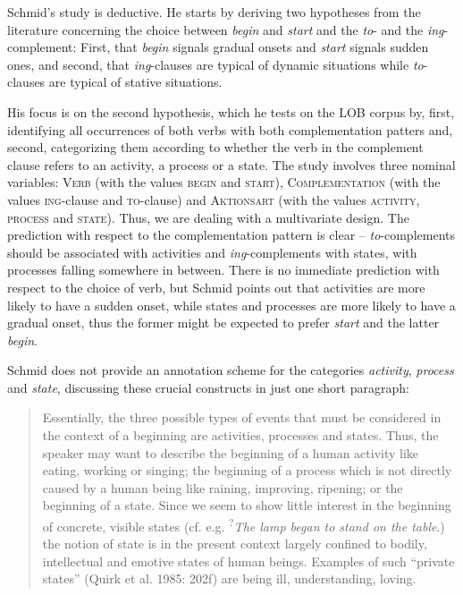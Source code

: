 Schmid's study is deductive. He starts by deriving two hypotheses from the literature concerning the choice between \textit{begin} and \textit{start} and the \textit{to}- and the \textit{ing}-complement: First, that \textit{begin} signals gradual onsets and \textit{start} signals sudden ones, and second, that \textit{ing}-clauses are typical of dynamic situations while \textit{to}-clauses are typical of stative situations.

His focus is on the second hypothesis, which he tests on the LOB corpus by, first, identifying all occurrences of both verbs with both complementation patters and, second, categorizing them according to whether the verb in the complement clause refers to an activity, a process or a state. The study involves three nominal variables: \textsc{Verb} (with the values \textsc{begin} and \textsc{start}), \textsc{Complementation} (with the values \textsc{ing}-clause and \textsc{to}-clause) and \textsc{Aktionsart} (with the values \textsc{activity}, \textsc{process} and \textsc{state}). Thus, we are dealing with a multivariate design. The prediction with respect to the complementation pattern is clear -- \textit{to}-complements should be associated with activities and \textit{ing}-complements with states, with processes falling somewhere in between. There is no immediate prediction with respect to the choice of verb, but Schmid points out that activities are more likely to have a sudden onset, while states and processes are more likely to have a gradual onset, thus the former might be expected to prefer \textit{start} and the latter \textit{begin}.

Schmid does not provide an annotation scheme for the categories \textit{activity}, \textit{process} and \textit{state}, discussing these crucial constructs in just one short paragraph:

\begin{quote}
Essentially, the three possible types of events that must be considered in the context of a beginning are activities, processes and states. Thus, the speaker may want to describe the beginning of a human activity like eating, working or singing; the beginning of a process which is not directly caused by a human being like raining, improving, ripening; or the beginning of a state. Since we seem to show little interest in the beginning of concrete, visible states (cf. e.g. \textsuperscript{?}\textit{The lamp began to stand on the table}.) the notion of state is in the present context largely confined to bodily, intellectual and emotive states of human beings. Examples of such ``private states'' (Quirk et al. 1985: 202f) are being ill, understanding, loving.
\end{quote}

